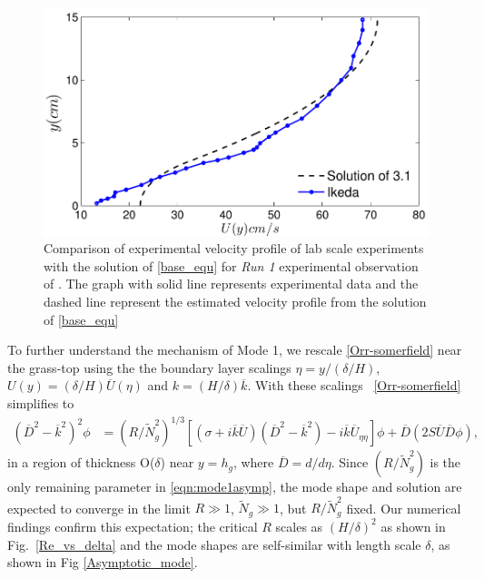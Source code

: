 \documentclass[12pt]{report}   %
\newcommand{\hg}{h_g}
\newcommand{\Rey}{{R}}
\newcommand{\Ndg}{\tilde{N}_g}
\renewcommand{\bar}{\overline}
\begin{document}
\begin{figure}
 \includegraphics{Ikeda_zero_shear_match}
 \caption{ Comparison of experimental velocity profile of lab scale experiments with the solution of \eqref{base_equ} for \textit{Run 1 } experimental observation of \cite{Ikeda96}. The graph with solid line represents experimental data and the dashed line represent the estimated velocity profile from the solution of \eqref{base_equ}    }
 \label{IkedaMatching}
\end{figure}


To further understand the mechanism of Mode 1, we rescale \eqref{Orr-somerfield} near the grass-top using the the boundary layer scalings $\eta = y/(\delta/H)$, 
$U(y) = (\delta/H)\bar{U}(\eta)$ and $k = (H/\delta) \bar{k}$.
With these scalings ~\eqref{Orr-somerfield} simplifies to
\begin{equation}
\begin{split}
\left(\bar{D}^2 -\bar{k}^{2} \right)^2\phi &= (\Rey/\Ndg^2)^{1/3} \left[ \left({\sigma}+i\bar{k}\bar{U}\right) \left(\bar{D}^2-\bar{k}^2\right) -i\bar{k}\bar{U}_{\eta\eta}\right]\phi + \bar{D}\left(2S \bar{U} \bar{D} \phi\right),
\label{eqn:mode1asymp}
\end{split}
\end{equation}
in a region of thickness O($\delta$) near $y=\hg$, where $\bar{D} = d/d\eta$. 
Since $(\Rey/\Ndg^2)$ is the only remaining parameter in \eqref{eqn:mode1asymp}, the mode shape and solution are expected to converge in the limit $\Rey \gg 1$, $\Ndg \gg 1$, but $\Rey/\Ndg^2$ fixed.
Our numerical findings confirm this expectation; the critical $\Rey$ scales as $(H/\delta)^2$ as shown in Fig.~\ref{Re_vs_delta} and the mode shapes are self-similar with length scale $\delta$, as shown in Fig \ref{Asymptotic_mode}. 
\end{document}
